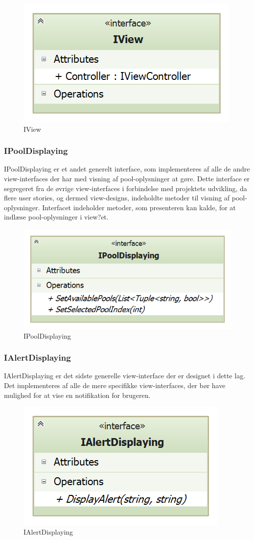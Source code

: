 \begin{figure}
	\centering
	\includegraphics[width=0.3\linewidth]{figs/design/application_iview}
	\caption{IView}
	\label{fig:application_iview}
\end{figure}

\subsubsection{IPoolDisplaying}
IPoolDisplaying er et andet generelt interface, som implementeres af alle de andre view-interfaces der har med visning af pool-oplysninger at gøre. Dette interface er segregeret fra de øvrige view-interfaces i forbindelse med projektets udvikling, da flere user stories, og dermed view-designs, indeholdte metoder til visning af pool-oplysninger. Interfacet indeholder metoder, som presenteren kan kalde, for at indlæse pool-oplysninger i view?et.

\begin{figure}
	\centering
	\includegraphics[width=0.4\linewidth]{figs/design/application_ipooldisplaying}
	\caption{IPoolDisplaying}
	\label{fig:application_ipooldisplaying}
\end{figure}

\subsubsection{IAlertDisplaying}
IAlertDisplaying er det sidste generelle view-interface der er designet i dette lag. Det implementeres af alle de mere specifikke view-interfaces, der bør have mulighed for at vise en notifikation for brugeren.

\begin{figure}
	\centering
	\includegraphics[width=0.3\linewidth]{figs/design/application_ialertdisplaying}
	\caption{IAlertDisplaying}
	\label{fig:application_ialertdisplaying}
\end{figure}

